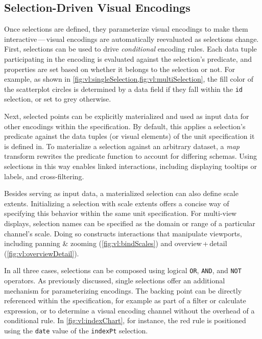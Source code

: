 \subsection{Selection-Driven Visual Encodings}

Once selections are defined, they parameterize visual encodings to make them
interactive\,---\,visual encodings are automatically reevaluated as selections
change. First, selections can be used to drive \emph{conditional} encoding
rules. Each data tuple participating in the encoding is evaluated against the
selection's predicate, and properties are set based on whether it belongs to the
selection or not. For example, as shown in
\cref{fig:vl:singleSelection,fig:vl:multiSelection}, the fill color of the scatterplot
circles is determined by a data field if they fall within the \texttt{id}
selection, or set to grey otherwise.

Next, selected points can be explicitly materialized and used as input data for
other encodings within the specification. By default, this applies a selection's
predicate against the data tuples (or visual elements) of the unit specification
it is defined in. To materialize a selection against an arbitrary dataset, a
\emph{map} transform rewrites the predicate function to account for differing
schemas. Using selections in this way enables linked interactions, including
displaying tooltips or labels, and cross-filtering.

Besides serving as input data, a materialized selection can also define scale
extents. Initializing a selection with scale extents offers a concise way of
specifying this behavior within the same unit specification. For multi-view
displays, selection names can be specified as the domain or range of a
particular channel's scale. Doing so constructs interactions that manipulate
viewports, including panning \& zooming (\cref{fig:vl:bindScales}) and
overview\,+\,detail (\cref{fig:vl:overviewDetail}).

In all three cases, selections can be composed using logical \texttt{OR},
\texttt{AND}, and \texttt{NOT} operators. As previously discussed, single
selections offer an additional mechanism for parameterizing encodings. The
backing point can be directly referenced within the specification, for example
as part of a filter or calculate expression, or to determine a visual encoding
channel without the overhead of a conditional rule. In \cref{fig:vl:indexChart},
for instance, the red rule is positioned using the \texttt{date} value of the
\texttt{indexPt} selection.

